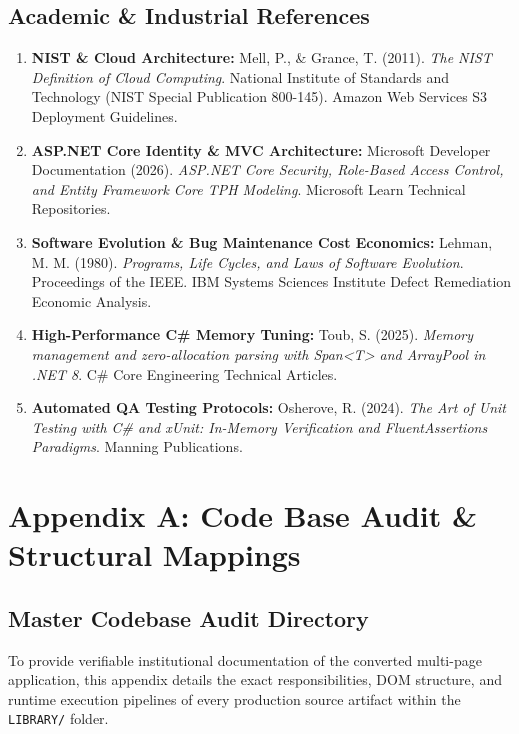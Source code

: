 \documentclass[10pt,journal,compsoc]{IEEEtran}
\begin{document}
\subsection{Academic \& Industrial References}
\begin{enumerate}[leftmargin=1.5em]
    \item \textbf{NIST \& Cloud Architecture:} Mell, P., \& Grance, T. (2011). \textit{The NIST Definition of Cloud Computing}. National Institute of Standards and Technology (NIST Special Publication 800-145). Amazon Web Services S3 Deployment Guidelines.
    \item \textbf{ASP.NET Core Identity \& MVC Architecture:} Microsoft Developer Documentation (2026). \textit{ASP.NET Core Security, Role-Based Access Control, and Entity Framework Core TPH Modeling}. Microsoft Learn Technical Repositories.
    \item \textbf{Software Evolution \& Bug Maintenance Cost Economics:} Lehman, M. M. (1980). \textit{Programs, Life Cycles, and Laws of Software Evolution}. Proceedings of the IEEE. IBM Systems Sciences Institute Defect Remediation Economic Analysis.
    \item \textbf{High-Performance C\# Memory Tuning:} Toub, S. (2025). \textit{Memory management and zero-allocation parsing with Span<T> and ArrayPool in .NET 8}. C\# Core Engineering Technical Articles.
    \item \textbf{Automated QA Testing Protocols:} Osherove, R. (2024). \textit{The Art of Unit Testing with C\# and xUnit: In-Memory Verification and FluentAssertions Paradigms}. Manning Publications.
\end{enumerate}

\newpage

\section{Appendix A: Code Base Audit \& Structural Mappings}

\subsection{Master Codebase Audit Directory}
To provide verifiable institutional documentation of the converted multi-page application, this appendix details the exact responsibilities, DOM structure, and runtime execution pipelines of every production source artifact within the \texttt{LIBRARY/} folder.
\end{document}
